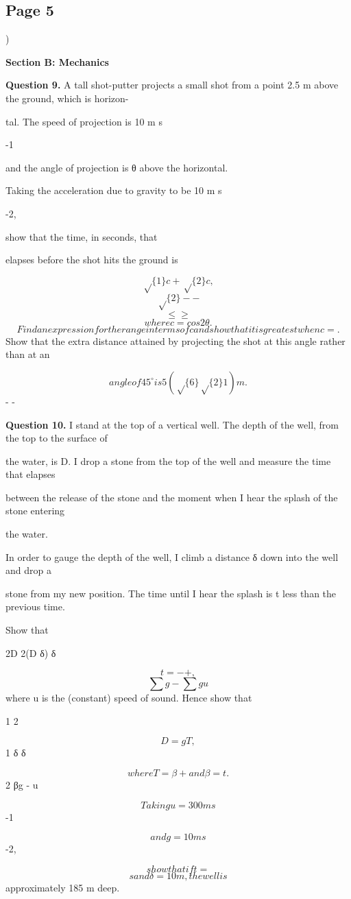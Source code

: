 \documentclass[12pt]{article}
\begin{document}
\subsection*{Page 5}
\begin{flushleft}
)\par
\bigskip\textbf{Section B: Mechanics}\par
\bigskip\textbf{Question 9.} A tall shot-putter projects a small shot from a point 2.5 m above the ground, which is horizon-\par
tal. The speed of projection is 10 m s\par
-1\par
and the angle of projection is θ above the horizontal.\par
Taking the acceleration due to gravity to be 10 m s\par
-2,\par
show that the time, in seconds, that\par
elapses before the shot hits the ground is\par
\[\sqrt\{1\} c + \sqrt\{2\} c ,\]
\[\sqrt\{2\} - -\]
\[\leq \geq\]
\[where c = cos 2θ.\]
\[Find an expression for the range in terms of c and show that it is greatest when c = .\]
Show that the extra distance attained by projecting the shot at this angle rather than at an\par
\[angle of 45 ^\circ is 5(\sqrt\{6\} \sqrt\{2\} 1) m.\]
- -\par
\bigskip\textbf{Question 10.} I stand at the top of a vertical well. The depth of the well, from the top to the surface of\par
the water, is D. I drop a stone from the top of the well and measure the time that elapses\par
between the release of the stone and the moment when I hear the splash of the stone entering\par
the water.\par
In order to gauge the depth of the well, I climb a distance δ down into the well and drop a\par
stone from my new position. The time until I hear the splash is t less than the previous time.\par
Show that\par
2D 2(D δ) δ\par
\[t = - + ,\]
\[\sum g - \sum g u\]
where u is the (constant) speed of sound. Hence show that\par
1 2\par
\[D = gT ,\]
1 δ δ\par
\[where T = β + and β = t .\]
2 βg - u\par
\[Taking u = 300 m s\]
-1\par
\[and g = 10 m s\]
-2,\par
\[show that if t =\]
\[s and δ = 10 m, the well is\]
approximately 185 m deep.\par
\end{flushleft}
\end{document}
